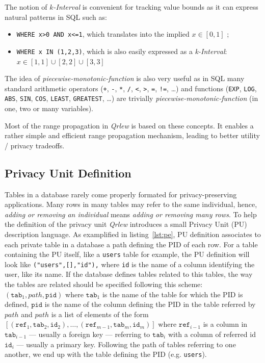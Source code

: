 \documentclass[letterpaper]{article} %
\newcommand{\qrlew}{\emph{Qrlew}}
\begin{document}
The notion of \emph{$k$-Interval} is convenient for tracking value bounds as it can express natural patterns in SQL such as:
\begin{itemize}
    \item \texttt{WHERE x>0 AND x<=1}, which translates into the implied $x\in \left[0, 1\right]$ ;
    \item \texttt{WHERE x IN (1,2,3)}, which is also easily expressed as a \emph{k-Interval}: $x \in \left[1, 1\right] \cup \left[2, 2\right] \cup \left[3, 3\right]$
\end{itemize}

The idea of \emph{piecewise-monotonic-function} is also very useful as in SQL many standard arithmetic operators (\texttt{+}, \texttt{-}, \texttt{*}, \texttt{/}, \texttt{<}, \texttt{>}, \texttt{=}, \texttt{!=}, \ldots) and functions (\texttt{EXP}, \texttt{LOG}, \texttt{ABS}, \texttt{SIN}, \texttt{COS}, \texttt{LEAST}, \texttt{GREATEST}, \ldots) are trivially \emph{piecewise-monotonic-function} (in one, two or many variables).

Most of the range propagation in \qrlew{} is based on these concepts. It enables a rather simple and efficient range propagation mechanism, leading to better utility / privacy tradeoffs.

\subsection{Privacy Unit Definition}

Tables in a database rarely come properly formated for privacy-preserving applications. Many rows in many tables may refer to the same individual, hence, \emph{adding or removing an individual} means \emph{adding or removing many rows}. To help the definition of the privacy unit \qrlew{} introduces a small Privacy Unit (PU) description language.
As examplified in listing~\ref{lst:pe}, PU definition associates to each private table in a database a path defining the PID of each row. For a table containing the PU itself, like a \texttt{users} table for example, the PU definition will look like \texttt{("users",[],"id"),} where \texttt{id} is the name of a column identifying the user, like its name. If the database defines tables related to this tables, the way the tables are related should be specified following this scheme: $(\mathtt{tab}_1, path, \mathtt{pid})$ where $\mathtt{tab}_1$ is the name of the table for which the PID is defined, $\mathtt{pid}$ is the name of the column defining the PID in the table referred by $path$ and $path$ is a list of elements of the form $[(\mathtt{ref}_1, \mathtt{tab}_2, \mathtt{id}_2),\ldots, (\mathtt{ref}_{m-1}, \mathtt{tab}_m, \mathtt{id}_m)]$
where $\mathtt{ref}_{i-1}$ is a column in $\mathtt{tab}_{i-1}$ --- usually a foreign key --- referring to $\mathtt{tab}_i$ with a column of referred id $\mathtt{id}_i$ --- usually a primary key. Following the path of tables referring to one another, we end up with the table defining the PID (e.g. \texttt{users}).
\end{document}
